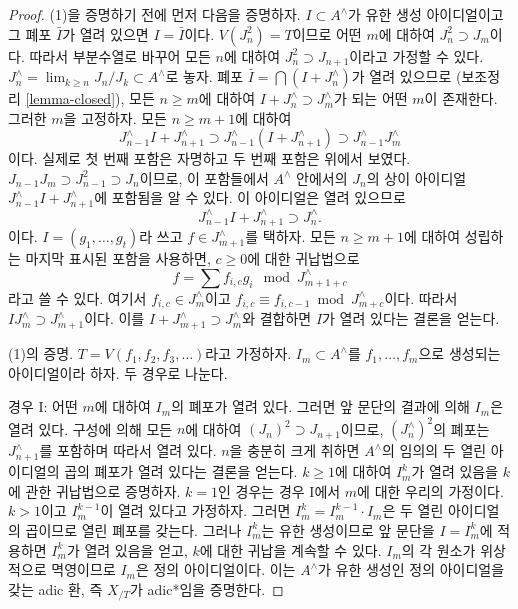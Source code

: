 \begin{proof}
\medskip\noindent
(1)을 증명하기 전에 먼저 다음을 증명하자. $I \subset A^\wedge$가
유한 생성 아이디얼이고 그 폐포 $\bar I$가 열려 있으면
$I = \bar I$이다. $V(J_n^2) = T$이므로 어떤 $m$에 대하여
$J_n^2 \supset J_m$이다. 따라서 부분수열로 바꾸어 모든 $n$에
대하여 $J_n^2 \supset J_{n + 1}$이라고 가정할 수 있다.
$J_n^\wedge = \lim_{k \geq n} J_n/J_k \subset A^\wedge$로 놓자.
폐포 $\bar I = \bigcap (I + J_n^\wedge)$가 열려 있으므로
(보조정리 \ref{lemma-closed}), 모든 $n \geq m$에 대하여
$I + J_n^\wedge \supset J_m^\wedge$가 되는 어떤 $m$이 존재한다.
그러한 $m$을 고정하자. 모든 $n \geq m + 1$에 대하여
$$
J_{n - 1}^\wedge I + J_{n + 1}^\wedge \supset
J_{n - 1}^\wedge (I + J_{n + 1}^\wedge) \supset
J_{n - 1}^\wedge J_m^\wedge
$$
이다. 실제로 첫 번째 포함은 자명하고 두 번째 포함은 위에서 보였다.
$J_{n - 1}J_m \supset J_{n - 1}^2 \supset J_n$이므로, 이 포함들에서
$A^\wedge$ 안에서의 $J_n$의 상이 아이디얼
$J_{n - 1}^\wedge I + J_{n + 1}^\wedge$에 포함됨을 알 수 있다.
이 아이디얼은 열려 있으므로
$$
J_{n - 1}^\wedge I + J_{n + 1}^\wedge \supset J_n^\wedge.
$$
이다. $I = (g_1, \ldots, g_t)$라 쓰고
$f \in J_{m + 1}^\wedge$를 택하자. 모든 $n \geq m + 1$에 대하여
성립하는 마지막 표시된 포함을 사용하면, $c \geq 0$에 대한
귀납법으로
$$
f = \sum f_{i, c} g_i \mod J_{m + 1+ c}^\wedge
$$
라고 쓸 수 있다. 여기서 $f_{i, c} \in J_m^\wedge$이고
$f_{i, c} \equiv f_{i, c - 1} \bmod J_{m + c}^\wedge$이다.
따라서 $IJ_m^\wedge \supset J_{m + 1}^\wedge$이다.
이를 $I + J_{m + 1}^\wedge \supset J_m^\wedge$와 결합하면
$I$가 열려 있다는 결론을 얻는다.

\medskip\noindent
(1)의 증명. $T = V(f_1, f_2, f_3, \ldots)$라고 가정하자.
$I_m \subset A^\wedge$를 $f_1, \ldots, f_m$으로 생성되는
아이디얼이라 하자. 두 경우로 나눈다.

\medskip\noindent
경우 I: 어떤 $m$에 대하여 $I_m$의 폐포가 열려 있다.
그러면 앞 문단의 결과에 의해 $I_m$은 열려 있다. 구성에 의해
모든 $n$에 대하여 $(J_n)^2 \supset J_{n+1}$이므로,
$(J_n^\wedge)^2$의 폐포는 $J_{n+1}^\wedge$를 포함하며 따라서
열려 있다. $n$을 충분히 크게 취하면 $A^\wedge$의 임의의 두 열린
아이디얼의 곱의 폐포가 열려 있다는 결론을 얻는다. $k \ge 1$에
대하여 $I_m^k$가 열려 있음을 $k$에 관한 귀납법으로 증명하자.
$k = 1$인 경우는 경우 I에서 $m$에 대한 우리의 가정이다.
$k > 1$이고 $I_m^{k - 1}$이 열려 있다고 가정하자. 그러면
$I_m^k = I_m^{k - 1} \cdot I_m$은 두 열린 아이디얼의 곱이므로
열린 폐포를 갖는다. 그러나 $I_m^k$는 유한 생성이므로 앞 문단을
$I = I_m^k$에 적용하면 $I_m^k$가 열려 있음을 얻고, $k$에 대한
귀납을 계속할 수 있다. $I_m$의 각 원소가 위상적으로 멱영이므로
$I_m$은 정의 아이디얼이다. 이는 $A^\wedge$가 유한 생성인 정의
아이디얼을 갖는 adic 환, 즉 $X_{/T}$가 adic*임을 증명한다.


\end{proof}
